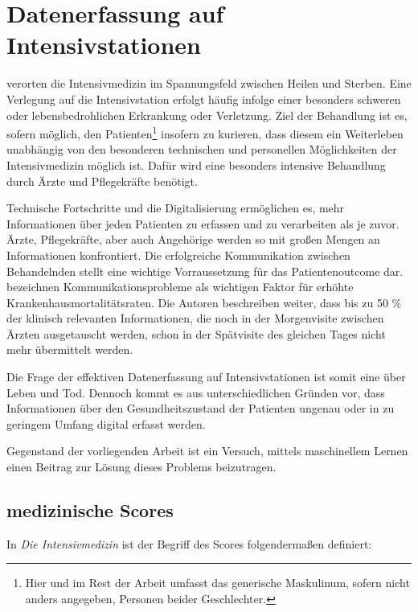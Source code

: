 \section{Datenerfassung auf Intensivstationen}

\cite{marxIntensivmedizin2015c} verorten die Intensivmedizin im Spannungsfeld zwischen Heilen und Sterben. Eine Verlegung auf die Intensivstation erfolgt häufig infolge einer besonders schweren oder lebensbedrohlichen Erkrankung oder Verletzung. 
Ziel der Behandlung ist es, sofern möglich, den Patienten\footnote{Hier und im Rest der Arbeit umfasst das generische Maskulinum, sofern nicht anders angegeben, Personen beider Geschlechter.} insofern zu kurieren, dass diesem ein Weiterleben unabhängig von den besonderen technischen und personellen Möglichkeiten der Intensivmedizin möglich ist. Dafür wird eine besonders intensive Behandlung durch Ärzte und Pflegekräfte benötigt.

Technische Fortschritte und die Digitalisierung ermöglichen es, mehr Informationen über jeden Patienten zu erfassen und zu verarbeiten als je zuvor. Ärzte, Pflegekräfte, aber auch Angehörige werden so mit großen Mengen an Informationen konfrontiert. Die erfolgreiche Kommunikation zwischen Behandelnden stellt eine wichtige Vorraussetzung für das Patientenoutcome dar. \cite{marxIntensivmedizin2015c} bezeichnen Kommunikationsprobleme als wichtigen Faktor für erhöhte Krankenhausmortalitätsraten. Die Autoren beschreiben weiter, dass bis zu 50 \% der klinisch relevanten Informationen, die noch in der Morgenvisite zwischen Ärzten ausgetauscht werden, schon in der Spätvisite des gleichen Tages nicht mehr übermittelt werden. %

Die Frage der effektiven Datenerfassung auf Intensivstationen ist somit eine über Leben und Tod. Dennoch kommt es aus unterschiedlichen Gründen vor, dass Informationen über den Gesundheitszustand der Patienten ungenau oder in zu geringem Umfang digital erfasst werden. 

Gegenstand der vorliegenden Arbeit ist ein Versuch, mittels maschinellem Lernen einen Beitrag zur Lösung dieses Problems beizutragen.

\subsection{medizinische Scores} \label{section:scores}

In \textit{Die Intensivmedizin} \citep{marxIntensivmedizin2015c} ist der Begriff des Scores folgendermaßen definiert:

